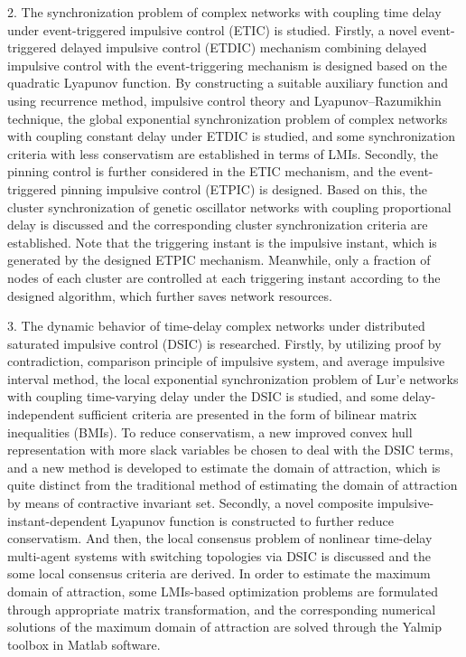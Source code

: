 2. The synchronization problem of complex networks with coupling time delay under event-triggered impulsive control (ETIC) is studied. Firstly, a novel event-triggered delayed impulsive control  (ETDIC) mechanism combining delayed impulsive control with the event-triggering mechanism is designed based on the quadratic Lyapunov function. By constructing a suitable auxiliary function and using recurrence method, impulsive control theory and Lyapunov–Razumikhin technique, the global exponential synchronization problem of complex networks with coupling constant delay under ETDIC  is studied, and some  synchronization criteria with less conservatism are established in terms of LMIs. Secondly, the  pinning control is further considered in the ETIC mechanism, and the event-triggered pinning impulsive control (ETPIC) is designed. Based on this, the cluster synchronization of genetic oscillator networks with coupling proportional delay is discussed 
and the corresponding cluster synchronization criteria are established. Note that the triggering instant is the impulsive instant, which is generated by  the designed ETPIC mechanism. Meanwhile, only a fraction of nodes of each cluster are controlled at each triggering instant according to the designed algorithm,  which further saves network resources.  
 
3. The dynamic behavior of time-delay complex networks under distributed saturated impulsive control (DSIC) is  researched. Firstly, by utilizing proof by contradiction,  comparison principle of impulsive system, and average impulsive interval method, the local exponential synchronization  problem of Lur'e networks with coupling time-varying delay under the  DSIC is studied, and some delay-independent sufficient criteria are presented in the form of bilinear matrix inequalities (BMIs). To reduce conservatism, a new improved convex hull representation with more slack variables be chosen to deal with the DSIC terms, and a new method is developed to estimate the domain of attraction,  which is quite distinct from the traditional method of estimating the domain of attraction by means of contractive invariant set. Secondly, a novel composite impulsive-instant-dependent Lyapunov function is constructed to further reduce conservatism. And then, the local consensus problem of nonlinear time-delay multi-agent systems with switching topologies via DSIC is discussed and the some local consensus criteria are derived. In order to estimate the maximum domain of attraction, some LMIs-based optimization problems  are formulated through appropriate matrix transformation, and the corresponding numerical solutions of the maximum domain of attraction are solved through the Yalmip toolbox in Matlab  software. 

